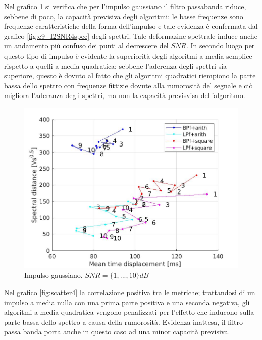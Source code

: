 \documentclass[9pt,twocolumn,twoside]{osajnl}
\begin{document}
Nel grafico \ref{fig:scatter2} si verifica che per l'impulso gaussiano il filtro passabanda riduce, sebbene di poco, la capacità previsiva degli algoritmi: le basse frequenze sono frequenze caratteristiche della forma dell'impulso e tale evidenza è confermata dal grafico \ref{fig:c9_I2SNR4spec} degli spettri. Tale deformazine spettrale induce anche un andamento più confuso dei punti al decrescere del $SNR$. In secondo luogo per questo tipo di impulso è evidente la superiorità degli algoritmi a media semplice rispetto a quelli a media quadratica: sebbene l'aderenza degli spettri sia superiore, questo è dovuto al fatto che gli algoritmi quadratici riempiono la parte bassa dello spettro con frequenze fittizie dovute alla rumorosità del segnale e ciò migliora l'aderanza degli spettri, ma non la capacità previsvisa dell'algoritmo.



\begin{figure}[htbp]
\centering
\includegraphics[width=1\linewidth]{results/scatter2.jpg}
\caption{Impulso gaussiano. $SNR= \{1, ..., 10\}dB$}
\label{fig:scatter2}
\end{figure}


Nel grafico \ref{fig:scatter4} la correlazione positiva tra le metriche; trattandosi di un impulso a media nulla con una prima parte positiva e una seconda negativa, gli algoritmi a media quadratica vengono penalizzati per l'effetto che inducono sulla parte bassa dello spettro a causa della rumorosità.
Evidenza inattesa, il filtro passa banda porta anche in questo caso ad una minor capacità previsiva.
\end{document}
